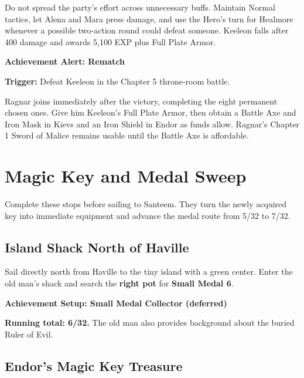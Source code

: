 \documentclass[
  american,
  10pt,
  letterpaper,
  oneside,
  open=any]{scrreprt}
\begin{document}
Do not spread the party's effort across unnecessary buffs. Maintain
Normal tactics, let Alena and Mara press damage, and use the Hero's turn
for Healmore whenever a possible two-action round could defeat someone.
Keeleon falls after 400 damage and awards 5,100 EXP plus Full Plate
Armor.

\begin{achievementalert}

\textbf{Achievement Alert: Rematch}

\textbf{Trigger:} Defeat Keeleon in the Chapter 5 throne-room battle.

\end{achievementalert}

Ragnar joins immediately after the victory, completing the eight
permanent chosen ones. Give him Keeleon's Full Plate Armor, then obtain
a Battle Axe and Iron Mask in Kievs and an Iron Shield in Endor as funds
allow. Ragnar's Chapter 1 Sword of Malice remains usable until the
Battle Axe is affordable.

\section{Magic Key and Medal Sweep}\label{magic-key-and-medal-sweep}

Complete these stops before sailing to Santeem. They turn the newly
acquired key into immediate equipment and advance the medal route from
5/32 to 7/32.

\subsection{Island Shack North of
Haville}\label{island-shack-north-of-haville}

Sail directly north from Haville to the tiny island with a green center.
Enter the old man's shack and search the \textbf{right pot} for
\textbf{Small Medal 6}.

\begin{achievementsetup}

\textbf{Achievement Setup: Small Medal Collector (deferred)}

\textbf{Running total: 6/32.} The old man also provides background about
the buried Ruler of Evil.

\end{achievementsetup}

\subsection{Endor's Magic Key Treasure}\label{endors-magic-key-treasure}
\end{document}
